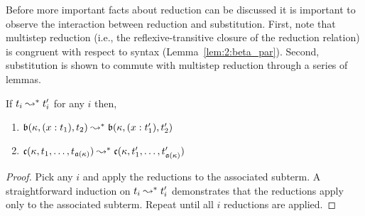 Before more important facts about reduction can be discussed it is important to observe the interaction between reduction and substitution.
First, note that multistep reduction (i.e., the reflexive-transitive closure of the reduction relation) is congruent with respect to syntax (Lemma~\ref{lem:2:beta_par}).
Second, substitution is shown to commute with multistep reduction through a series of lemmas.

\begin{lemma}
    If $t_i \leadsto^* t_i^\prime$ for any $i$ then,
    \begin{enumerate}
        \item $\mathfrak{b}(\kappa, (x : t_1), t_2) \leadsto^* \mathfrak{b}(\kappa, (x : t_1^\prime), t_2^\prime)$
        \item $\mathfrak{c}(\kappa, t_1,\ldots,t_{\mathfrak{a}(\kappa)}) \leadsto^* \mathfrak{c}(\kappa, t_1^\prime,\ldots,t_{\mathfrak{a}(\kappa)}^\prime)$
    \end{enumerate}
    \label{lem:2:beta_par}
\end{lemma}
\begin{proof}
    Pick any $i$ and apply the reductions to the associated subterm.
    A straightforward induction on $t_i \leadsto^* t_i^\prime$ demonstrates that the reductions apply only to the associated subterm.
    Repeat until all $i$ reductions are applied.
\end{proof}

